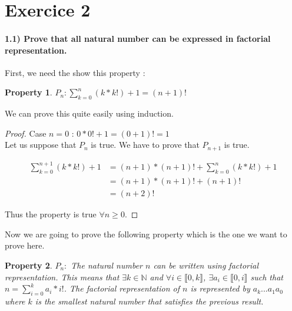 \documentclass{article}
\newtheorem{prop}{Property}
\begin{document}
\nocite{*}

\section*{Exercice 2}

\paragraph{1.1) Prove that all natural number can be expressed in factorial representation.}

First, we need the show this property :

\begin{prop}
  \label{prop1}
  $P_n : \displaystyle\sum_{k=0}^n (k*k!) +1 = (n+1)!$
\end{prop}

We can prove this quite easily using induction.

\begin{proof}

  Case $n=0$ : $0*0! + 1 = (0+1)! = 1$\\

  Let us suppose that $P_n$ is true. We have to prove that $P_{n+1}$ is true.

  \begin{equation*}
    \begin{split}
      \displaystyle\sum_{k=0}^{n+1} (k*k!) +1 & = (n+1)*(n+1)! + \displaystyle\sum_{k=0}^n (k*k!) +1 \\
       & = (n+1)*(n+1)! + (n+1)! \\
       & = (n+2)!
    \end{split}
  \end{equation*}

  Thus the property is true $\forall n \geq  0$.
\end{proof}

Now we are going to prove the following property which is the one we want to prove here.

\begin{prop}
  $P_n : $ The natural number $n$ can be written using factorial representation. This means that $\exists k \in \mathbb{N}$ and $\forall i \in \llbracket 0, k\rrbracket$, $ \exists a_i \in \llbracket 0, i\rrbracket$ such that $n = \displaystyle\sum_{i=0}^k a_i*i!$. The factorial representation of $n$ is represented by $a_k...a_1a_0$ where $k$ is the smallest natural number that satisfies the previous result.
\end{prop}
\end{document}
